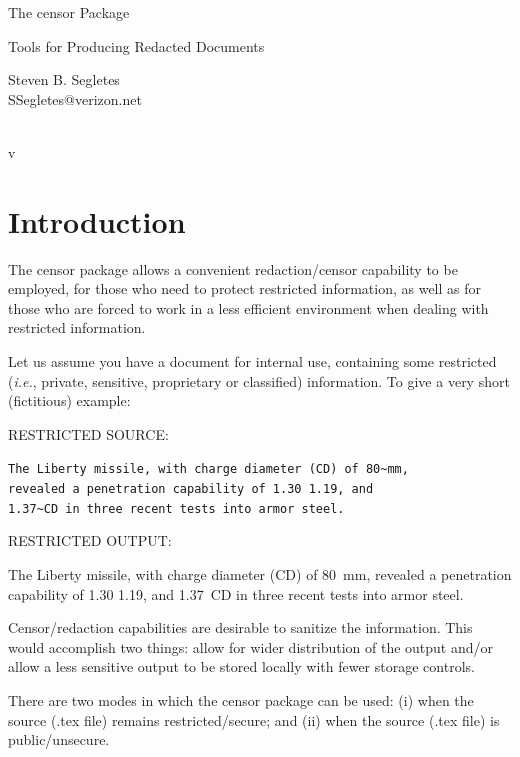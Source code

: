 \documentclass{article}
\begin{document}
\vspace*{0in}
\begin{center}
\LARGE The \textsf{censor} Package\\
\small \rule{0in}{1em}Tools for Producing Redacted Documents\\
\large \rule{0in}{2em} Steven B. Segletes\\
SSegletes@verizon.net\\
\rule{0em}{2em}\censorversiondate\\
v\censorversionnumber
\end{center}

\section{Introduction}

The \textsf{censor} package allows a convenient redaction/censor
capability to be employed, for those who need to protect restricted
information, as well as for those who are forced to work in a less
efficient environment when dealing with restricted information.

Let us assume you have a document for internal use, containing some
restricted (\textit{i.e.}, private, sensitive, proprietary or
classified) information.  To give a very short (fictitious) example:

{\addtolength{\leftskip}{2.3em}
RESTRICTED SOURCE: \hrulefill

\verb|The Liberty missile, with charge diameter (CD) of 80~mm, |\\
\verb|revealed a penetration capability of 1.30 1.19, and |\\
\verb|1.37~CD in three recent tests into armor steel.|

RESTRICTED OUTPUT: \hrulefill

The Liberty missile, with charge diameter (CD) of 80~mm, revealed a
penetration capability of 1.30 1.19, and 1.37~CD in three recent tests
into armor steel.

\hrulefill

}

Censor/redaction capabilities are desirable to sanitize the information.
This would accomplish two things:  allow for wider distribution of the
output and/or allow a less sensitive output to be stored locally with
fewer storage controls.

There are two modes in which the censor package can be used: (i) when
the source (.tex file) remains restricted/secure; and (ii) when the source
(.tex file) is public/unsecure.
\end{document}
